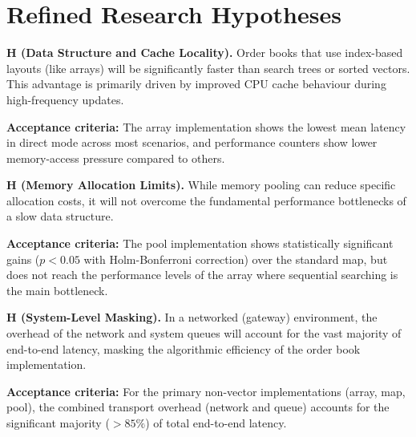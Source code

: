 \renewcommand{\thehyp}{H\arabic{hyp}}

\section*{Refined Research Hypotheses}

\noindent\textbf{\thehyp\label{hyp:h1} (Data Structure and Cache Locality).} 
Order books that use index-based layouts (like arrays) will be significantly faster 
than search trees or sorted vectors. This advantage is primarily driven by 
improved CPU cache behaviour during high-frequency updates.

\medskip
\noindent\textbf{Acceptance criteria:} The array implementation shows the lowest mean 
latency in direct mode across most scenarios, and performance counters show 
lower memory-access pressure compared to others.

\bigskip
\noindent\textbf{\thehyp\label{hyp:h2} (Memory Allocation Limits).} 
While memory pooling can reduce specific allocation costs, it will not overcome 
the fundamental performance bottlenecks of a slow data structure.

\medskip
\noindent\textbf{Acceptance criteria:} The pool implementation shows 
statistically significant gains ($p < 0.05$ with Holm-Bonferroni 
correction) over the standard map, but does not reach the 
performance levels of the array where sequential searching is the 
main bottleneck.

\bigskip
\noindent\textbf{\thehyp\label{hyp:h3} (System-Level Masking).} 
In a networked (gateway) environment, the overhead of the network and system 
queues will account for the vast majority of end-to-end latency, masking the 
algorithmic efficiency of the order book implementation.

\medskip
\noindent\textbf{Acceptance criteria:} For the primary non-vector 
implementations (array, map, pool), the combined transport overhead 
(network and queue) accounts for the significant majority ($>85\%$) 
of total end-to-end latency.
